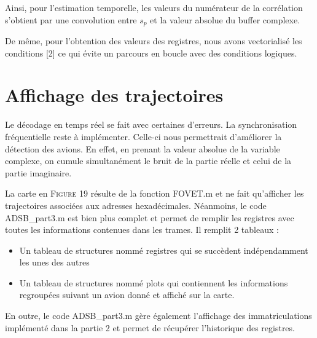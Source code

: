 \documentclass[a4paper, 10pt]{article}
\begin{document}
    \vspace{10pt}
    Ainsi, pour l'estimation temporelle, les valeurs du numérateur de la corrélation s'obtient par une convolution entre $s_p$ et la valeur absolue du buffer complexe.
    
    \vspace{10pt}
    De même, pour l'obtention des valeurs des registres, nous avons vectorialisé les conditions [2] ce qui évite un parcours en boucle avec des conditions logiques.

    \vspace{10pt}
\part{Affichage des trajectoires}
    \setcounter{section}{3}
    \setcounter{subsection}{0}
    Le décodage en temps réel se fait avec certaines d'erreurs. La synchronisation fréquentielle reste à implémenter. Celle-ci nous permettrait d'améliorer la détection des avions. En effet, en prenant la valeur absolue de la variable complexe, on cumule simultanément le bruit de la partie réelle et celui de la partie imaginaire.
    
    \vspace{10pt}
    
    La carte en F\textsc{igure} 19 résulte de la fonction \textsf{FOVET.m} et ne fait qu'afficher les trajectoires associées aux adresses hexadécimales. Néanmoins, le code \textsf{ADSB\_part3.m} est bien plus complet et permet de remplir les registres avec toutes les informations contenues dans les trames. Il remplit 2 tableaux :
    \begin{itemize}
    \item Un tableau de structures nommé \textsf{registres} qui se succèdent indépendamment les unes des autres
    \item Un tableau de structures nommé \textsf{plots} qui contiennent les informations regroupées suivant un avion donné et affiché sur la carte.
    \end{itemize}
    
    \vspace{10pt}
    
    En outre, le code \textsf{ADSB\_part3.m} gère également l'affichage des immatriculations implémenté dans la partie 2 et permet de récupérer l'historique des registres.
    
    \vspace{10pt}
    
\end{document}
